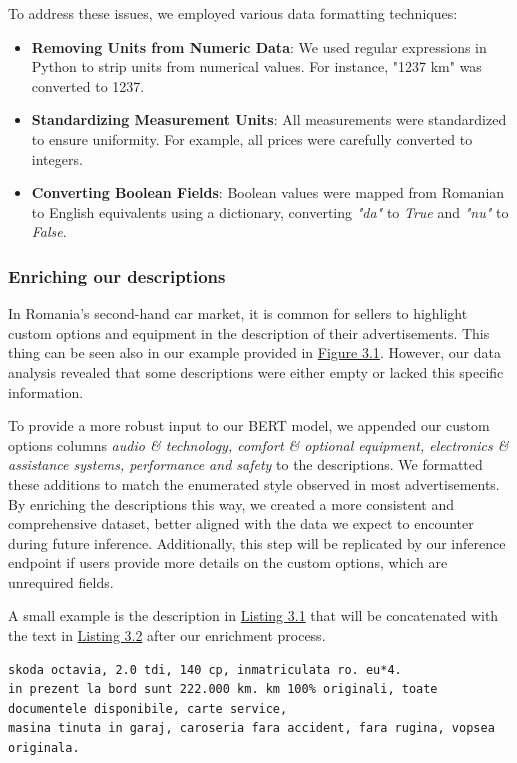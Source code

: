 To address these issues, we employed various data formatting techniques:
\begin{itemize}
    \item \textbf{Removing Units from Numeric Data}: We used regular expressions in Python to strip units from numerical values. For instance, "1237 km" was converted to 1237.
    \item \textbf{Standardizing Measurement Units}: All measurements were standardized to ensure uniformity. For example, all prices were carefully converted to integers.
    \item \textbf{Converting Boolean Fields}: Boolean values were mapped from Romanian to English equivalents using a dictionary, converting \textit{"da"} to \textit{True} and \textit{"nu"} to \textit{False}.
\end{itemize}

\subsubsection{Enriching our descriptions}
In Romania's second-hand car market, it is common for sellers to highlight custom options and equipment in the description of their advertisements. This thing can be seen also in our example provided in \hyperref[fig:scraping-details]{Figure 3.1}. However, our data analysis revealed that some descriptions were either empty or lacked this specific information. 

To provide a more robust input to our BERT model, we appended our custom options columns \textit{audio \& technology, comfort \& optional equipment, electronics \& assistance systems, performance and safety} to the descriptions. We formatted these additions to match the enumerated style observed in most advertisements. By enriching the descriptions this way, we created a more consistent and comprehensive dataset, better aligned with the data we expect to encounter during future inference. Additionally, this step will be replicated by our inference endpoint if users provide more details on the custom options, which are unrequired fields.

A small example is the description in \hyperref[lst:description-before]{Listing 3.1} that will be concatenated with the text in \hyperref[lst:description-after]{Listing 3.2} after our enrichment process.

\begin{lstlisting}[caption={Raw Description}, label={lst:description-before}, language={}]
skoda octavia, 2.0 tdi, 140 cp, inmatriculata ro. eu*4.
in prezent la bord sunt 222.000 km. km 100% originali, toate documentele disponibile, carte service,
masina tinuta in garaj, caroseria fara accident, fara rugina, vopsea originala.
\end{lstlisting}

